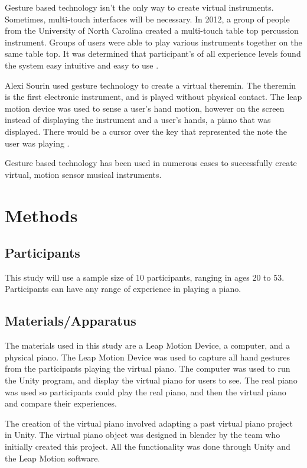 \documentclass[sigconf,authordraft]{acmart}
\begin{document}
Gesture based technology isn't the only way to create virtual instruments.  Sometimes, multi-touch interfaces will be necessary.  In 2012, a group of people from the University of North Carolina created a multi-touch table top percussion instrument.  Groups of users were able to play various instruments together on the same table top.  It was determined that participant's of all experience levels found the system easy intuitive and easy to use \cite{Ren}.

Alexi Sourin used gesture technology to create a virtual theremin.  The theremin is the first electronic instrument, and is played without physical contact.  The leap motion device was used to sense a user's hand motion, however on the screen instead of displaying the instrument and a user's hands, a piano that was displayed.  There would be a cursor over the key that represented the note the user was playing \cite{Sourin}.

Gesture based technology has been used in numerous cases to successfully create virtual, motion sensor musical instruments.

\section{Methods}
\subsection{Participants}
This study will use a sample size of 10 participants, ranging in ages 20 to 53.  Participants can have any range of experience in playing a piano.

\subsection{Materials/Apparatus}
The materials used in this study are a Leap Motion Device, a computer, and a physical piano.  The Leap Motion Device was used to capture all hand gestures from the participants playing the virtual piano.  The computer was used to run the Unity program, and display the virtual piano for users to see.  The real piano was used so participants could play the real piano, and then the virtual piano and compare their experiences.  

The creation of the virtual piano involved adapting a past virtual piano project in Unity.  The virtual piano object was designed in blender by the team who initially created this project.  All the functionality was done through Unity and the Leap Motion software.
\end{document}
